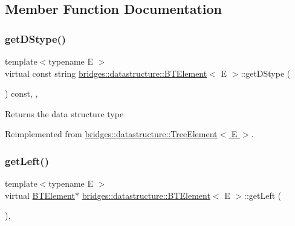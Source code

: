 \subsection{Member Function Documentation}
\mbox{\label{classbridges_1_1datastructure_1_1_b_t_element_a2118b6b74f3fe0fec39e3b258a7dee89}} 
\subsubsection{\texorpdfstring{get\+D\+Stype()}{getDStype()}}
{\footnotesize\ttfamily template$<$typename E $>$ \\
virtual const string \hyperlink{classbridges_1_1datastructure_1_1_b_t_element}{bridges\+::datastructure\+::\+B\+T\+Element}$<$ E $>$\+::get\+D\+Stype (\begin{DoxyParamCaption}{ }\end{DoxyParamCaption}) const\hspace{0.3cm}{\ttfamily [inline]}, {\ttfamily [override]}, {\ttfamily [virtual]}}

\begin{DoxyReturn}{Returns}
the data structure type 
\end{DoxyReturn}


Reimplemented from \hyperlink{classbridges_1_1datastructure_1_1_tree_element_a897f34ea284da45e1dc869c3e3b6c9a4}{bridges\+::datastructure\+::\+Tree\+Element$<$ E $>$}.

\mbox{\label{classbridges_1_1datastructure_1_1_b_t_element_aaa551a4f24bb7ed63fd39e9c4153402b}} 
\subsubsection{\texorpdfstring{get\+Left()}{getLeft()}\hspace{0.1cm}{\footnotesize\ttfamily [1/2]}}
{\footnotesize\ttfamily template$<$typename E $>$ \\
virtual \hyperlink{classbridges_1_1datastructure_1_1_b_t_element}{B\+T\+Element}$\ast$ \hyperlink{classbridges_1_1datastructure_1_1_b_t_element}{bridges\+::datastructure\+::\+B\+T\+Element}$<$ E $>$\+::get\+Left (\begin{DoxyParamCaption}{ }\end{DoxyParamCaption})\hspace{0.3cm}{\ttfamily [inline]}, {\ttfamily [virtual]}}

